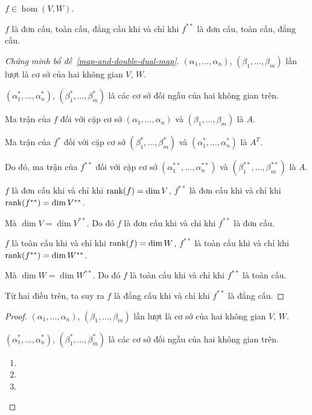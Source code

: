 \documentclass[class=linearalgebra,crop=false]{standalone}
\begin{document}
\begin{lemma}\label{map-and-double-dual-map}
    $f\in\hom(V, W)$.
    \par $f$ là đơn cấu, toàn cấu, đẳng cấu khi và chỉ khi $f^{**}$ là đơn cấu, toàn cấu, đẳng cấu.
\end{lemma}

\begin{proof}[Chứng minh bổ đề~\ref{map-and-double-dual-map}]
    $(\alpha_{1}, \ldots, \alpha_{n})$, $(\beta_{1}, \ldots, \beta_{m})$ lần lượt là cơ sở của hai không gian $V$, $W$.
    \par $(\alpha^{*}_{1}, \ldots, \alpha^{*}_{n})$, $(\beta^{*}_{1}, \ldots, \beta^{*}_{m})$ là các cơ sở đối ngẫu của hai không gian trên.
    \par Ma trận của $f$ đối với cặp cơ sở $(\alpha_{1},\ldots,\alpha_{n})$ và $(\beta_{1},\ldots,\beta_{m})$ là $A$.
    \par Ma trận của $f^{*}$ đối với cặp cơ sở $(\beta^{*}_{1},\ldots,\beta^{*}_{m})$ và $(\alpha^{*}_{1},\ldots,\alpha^{*}_{n})$ là $A^{T}$.
    \par Do đó, ma trận của $f^{**}$ đối với cặp cơ sở $(\alpha^{**}_{1},\ldots,\alpha^{**}_{n})$ và $(\beta^{**}_{1}, \ldots, \beta^{**}_{m})$ là $A$.
    \bigskip
    \par $f$ là đơn cấu khi và chỉ khi $\text{rank}(f) = \dim V$, $f^{**}$ là đơn cấu khi và chỉ khi $\text{rank}(f^{**}) = \dim V^{**}$.
    \par Mà $\dim V = \dim V^{**}$. Do đó $f$ là đơn cấu khi và chỉ khi $f^{**}$ là đơn cấu.
    \par $f$ là toàn cấu khi và chỉ khi $\text{rank}(f) = \dim W$, $f^{**}$ là toàn cấu khi và chỉ khi $\text{rank}(f^{**}) = \dim W^{**}$.
    \par Mà $\dim W = \dim W^{**}$. Do đó $f$ là toàn cấu khi và chỉ khi $f^{**}$ là toàn cấu.
    \par Từ hai điều trên, ta suy ra $f$ là đẳng cấu khi và chỉ khi $f^{**}$ là đẳng cấu.
\end{proof}

\begin{proof}
    $(\alpha_{1}, \ldots, \alpha_{n})$, $(\beta_{1}, \ldots, \beta_{m})$ lần lượt là cơ sở của hai không gian $V$, $W$.
    \par $(\alpha^{*}_{1}, \ldots, \alpha^{*}_{n})$, $(\beta^{*}_{1}, \ldots, \beta^{*}_{m})$ là các cơ sở đối ngẫu của hai không gian trên.
    \begin{enumerate}[label = (\arabic*)]
        \item
        \item
        \item
    \end{enumerate}
\end{proof}
\end{document}
